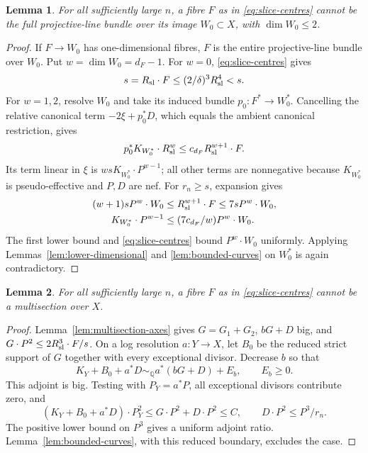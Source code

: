 \documentclass[12pt,a4paper,psamsfonts]{amsart}
\theoremstyle{definition}
\theoremstyle{plain}
\newtheorem{lemma}{Lemma}[section]
\newcommand{\Q}{\mathbb Q}
\begin{document}
\begin{lemma}\label{lem:saturated-slices}
For all sufficiently large $n$, a fibre $F$ as in
\eqref{eq:slice-centres} cannot be the full projective-line bundle
over its image $W_0\subset X$, with $\dim W_0\le2$.
\end{lemma}
\begin{proof}
If $F\to W_0$ has one-dimensional fibres, $F$ is the entire
projective-line bundle over $W_0$. Put $w=\dim W_0=d_F-1$.
For $w=0$, \eqref{eq:slice-centres} gives
\[
 s=R_{\rm sl}\cdot F\le(2/\delta)^3R_{\rm sl}^4<s.
\]
For $w=1,2$, resolve $W_0$ and take its induced bundle
$p_0:F^*\to W_0^*$. Cancelling the relative canonical term
$-2\xi+p_0^*D$, which equals the ambient canonical restriction,
gives
\[
 p_0^*K_{W_0^*}\cdot R_{\rm sl}^w\le c_{d_F}R_{\rm sl}^{w+1}\cdot F.
\]
Its term linear in $\xi$ is $wsK_{W_0^*}\cdot P^{w-1}$; all other
terms are nonnegative because $K_{W_0^*}$ is pseudo-effective
and $P,D$ are nef. For $r_n\ge s$, expansion gives
\begin{equation}\label{eq:saturated-estimate}
 \begin{split}
 (w+1)sP^w\cdot W_0&\le R_{\rm sl}^{w+1}\cdot F\le7sP^w\cdot W_0,\\
 K_{W_0^*}\cdot P^{w-1}&\le(7c_{d_F}/w)P^w\cdot W_0.
 \end{split}
\end{equation}
The first lower bound and \eqref{eq:slice-centres} bound $P^w\cdot W_0$
uniformly. Applying Lemmas~\ref{lem:lower-dimensional} and
\ref{lem:bounded-curves} on $W_0^*$ is again contradictory.
\end{proof}

\begin{lemma}\label{lem:multisection-slices}
For all sufficiently large $n$, a fibre $F$ as in
\eqref{eq:slice-centres} cannot be a multisection over $X$.
\end{lemma}
\begin{proof}
Lemma~\ref{lem:multisection-axes} gives $G=G_1+G_2$, $bG+D$ big,
and $G\cdot P^2\le2R_{\rm sl}^3\cdot F/s$. On a log resolution $a:Y\to X$,
let $B_0$ be the reduced strict support of $G$ together with every
exceptional divisor. Decrease $b$ so that
\[
 K_Y+B_0+a^*D\sim_\Q a^*(bG+D)+E_b,\qquad E_b\ge0.
\]
This adjoint is big. Testing with $P_Y=a^*P$, all exceptional
divisors contribute zero, and
\[
 (K_Y+B_0+a^*D)\cdot P_Y^2\le G\cdot P^2+D\cdot P^2\le C,
 \qquad D\cdot P^2\le P^3/r_n.
\]
The positive lower bound on $P^3$ gives a uniform adjoint ratio.
Lemma~\ref{lem:bounded-curves}, with this reduced boundary,
excludes the case.
\end{proof}
\end{document}
